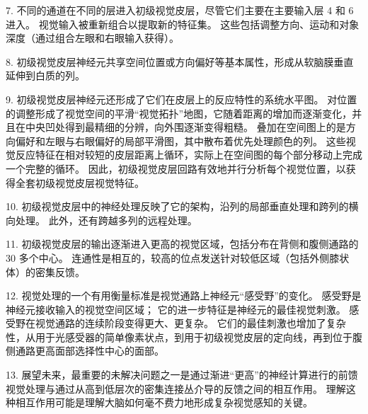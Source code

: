 7. 不同的通道在不同的层进入初级视觉皮层，尽管它们主要在主要输入层 4 和 6 进入。
视觉输入被重新组合以提取新的特征集。
这些包括调整方向、运动和对象深度（通过组合左眼和右眼输入获得）。
 

8. 初级视觉皮层神经元共享空间位置或方向偏好等基本属性，形成从软脑膜垂直延伸到白质的列。
 


9. 初级视觉皮层神经元还形成了它们在皮层上的反应特性的系统水平图。
对位置的调整形成了视觉空间的平滑“视觉拓扑”地图，它随着距离的增加而逐渐变化，并且在中央凹处得到最精细的分辨，向外围逐渐变得粗糙。
叠加在空间图上的是方向偏好和左眼与右眼偏好的局部平滑图，其中散布着优先处理颜色的列。
这些视觉反应特征在相对较短的皮层距离上循环，实际上在空间图的每个部分移动上完成一个完整的循环。
因此，初级视觉皮层回路有效地并行分析每个视觉位置，以获得全套初级视觉皮层视觉特征。 


10. 初级视觉皮层中的神经处理反映了它的架构，沿列的局部垂直处理和跨列的横向处理。
此外，还有跨越多列的远程处理。


11. 初级视觉皮层的输出逐渐进入更高的视觉区域，包括分布在背侧和腹侧通路的 30 多个中心。
连通性是相互的，较高的位点发送针对较低区域（包括外侧膝状体）的密集反馈。 


12. 视觉处理的一个有用衡量标准是视觉通路上神经元“感受野”的变化。
感受野是神经元接收输入的视觉空间区域；
它的进一步特征是神经元的最佳视觉刺激。
感受野在视觉通路的连续阶段变得更大、更复杂。
它们的最佳刺激也增加了复杂性，从用于光感受器的简单像素状点，到用于初级视觉皮层的定向线，再到位于腹侧通路更高面部选择性中心的面部。


13. 展望未来，最重要的未解决问题之一是通过渐进“更高”的神经计算进行的前馈视觉处理与通过从高到低层次的密集连接丛介导的反馈之间的相互作用。
理解这种相互作用可能是理解大脑如何毫不费力地形成复杂视觉感知的关键。

